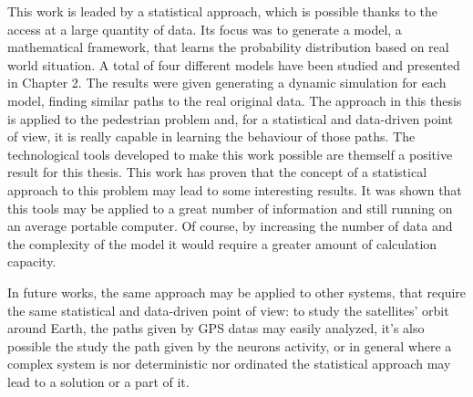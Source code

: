 \documentclass[class=article, crop=false]{standalone}
\begin{document}

This work is leaded by a statistical approach, which is possible thanks to the access at a large quantity of data.
Its focus was to generate a model, a mathematical framework, that learns the probability distribution based on real world situation.
A total of four different models have been studied and presented in Chapter 2.
The results were given generating a dynamic simulation for each model, finding similar paths to the real original data.
The approach in this thesis is applied to the pedestrian problem and, for a statistical and data-driven point of view, it is really capable in learning the behaviour of those paths.
The technological tools developed to make this work possible are themself a positive result for this thesis.
This work has proven that the concept of a statistical approach to this problem may lead to some interesting results.
It was shown that this tools may be applied to a great number of information and still running on an average portable computer.
Of course, by increasing the number of data and the complexity of the model it would require a greater amount of calculation capacity.

In future works, the same approach may be applied to other systems, that require the same statistical and data-driven point of view: 
to study the satellites' orbit around Earth, the paths given by GPS datas may easily analyzed, it's also possible the study the path given by the neurons activity, 
or in general where a complex system is nor deterministic nor ordinated the statistical approach may lead to a solution or a part of it.
\end{document}
